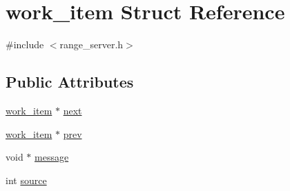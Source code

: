 \hypertarget{structwork__item}{\section{work\-\_\-item Struct Reference}
\label{structwork__item}
}


{\ttfamily \#include $<$range\-\_\-server.\-h$>$}

\subsection*{Public Attributes}
\begin{DoxyCompactItemize}
\item 
\hyperlink{structwork__item}{work\-\_\-item} $\ast$ \hyperlink{structwork__item_a63063b910e219526f27dcd391ed4af38}{next}
\item 
\hyperlink{structwork__item}{work\-\_\-item} $\ast$ \hyperlink{structwork__item_adf400e3104c2071b1f192d48690408b4}{prev}
\item 
void $\ast$ \hyperlink{structwork__item_a2c6449b530233592562d05debbab126f}{message}
\item 
int \hyperlink{structwork__item_aafb1f7c16f606a3fd5a9ee24d3a34a42}{source}
\end{DoxyCompactItemize}


